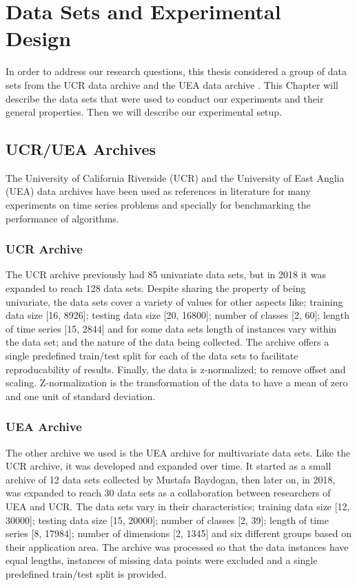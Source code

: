\chapter{Data Sets and Experimental Design}
\label{Chapter data sets}
In order to address our research questions, this thesis considered a group of data sets from the UCR data archive \cite{UCRArchive2018} and the UEA data archive \cite{bagnall2018uea}.
This Chapter will describe the data sets that were used to conduct our experiments and their general properties.
Then we will describe our experimental setup.

\section{UCR/UEA Archives}
\label{DataArchives}
The University of California Riverside (UCR) and the University of East Anglia (UEA) data archives have been used as references in literature for many experiments on time series problems \cite{abanda2019review,fawaz2020inceptiontime,bagnall2017great,yazdanbakhsh2019multivariate,ruiz2020great,fawaz2019deepreview}
and specially for benchmarking the performance of algorithms.

\subsection{UCR Archive}
\label{UCR}
The UCR archive previously had 85 univariate data sets, but in 2018 it was expanded to reach 128 data sets.
Despite sharing the property of being univariate, the data sets cover a variety of values for other aspects like;
training data size [16, 8926]; testing data size [20, 16800]; number of classes [2, 60]; length of time series [15, 2844] and for some data sets length of instances vary within the data set;
and the nature of the data being collected. The archive offers a single predefined train/test split for each of the data sets to facilitate reproducability of results.
Finally, the data is z-normalized; to remove offset and scaling. Z-normalization is the transformation of the data to have a mean of zero and one unit of standard deviation.

\subsection{UEA Archive}
\label{UEA}
The other archive we used is the UEA archive for multivariate data sets. Like the UCR archive, it was developed and expanded over time.
It started as a small archive of 12 data sets collected by Mustafa Baydogan,
then later on, in 2018, was expanded to reach 30 data sets as a collaboration between researchers of UEA and UCR. The data sets vary in their characteristics;
training data size [12, 30000]; testing data size [15, 20000]; number of classes [2, 39]; length of time series [8, 17984]; number of dimensions [2, 1345] and six different groups based on their application area.
The archive was processed so that the data instances have equal lengths, instances of missing data points were excluded and a single predefined train/test split is provided.


